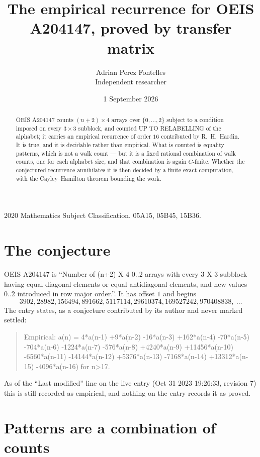 \documentclass[11pt,a4paper]{article}
\title{The empirical recurrence for OEIS A204147, proved by transfer matrix}
\author{Adrian Perez Fontelles\\ \small Independent researcher}
\date{1 September 2026}
\theoremstyle{plain}
\theoremstyle{definition}
\begin{document}
\maketitle

\begin{abstract}
OEIS A204147 counts $(n+2)\times4$ arrays over $\{0,\dots,2\}$ subject to a condition imposed on
every $3\times3$ subblock, and counted UP TO RELABELLING of the
alphabet; it carries an empirical recurrence of order $16$ contributed by
R.~H.~Hardin. It is true, and it is decidable rather than empirical. What is counted is
equality patterns, which is not a walk count --- but it is a fixed rational combination of
walk counts, one for each alphabet size, and that combination is again $C$-finite. Whether the
conjectured recurrence annihilates it is then decided by a finite exact computation, with the
Cayley--Hamilton theorem bounding the work.
\end{abstract}

\noindent\small 2020 Mathematics Subject Classification. 05A15, 05B45, 15B36.\normalsize

\section{The conjecture}

OEIS A204147 is ``Number of (n+2) X 4 0..2 arrays with every 3 X 3 subblock having equal diagonal elements or equal antidiagonal elements, and new values 0..2 introduced in row major order.''. It has offset $1$ and begins
\[
3902, 28982, 156494, 891662, 5117114, 29610374, 169527242, 970408838,\ \dots
\]
The entry states, as a conjecture contributed by its author and never marked settled:
\begin{quote}
Empirical: a(n) = 4*a(n-1) +9*a(n-2) -16*a(n-3) +162*a(n-4) -70*a(n-5) -704*a(n-6) -1224*a(n-7) -576*a(n-8) +4240*a(n-9) +11456*a(n-10) -6560*a(n-11) -14144*a(n-12) +5376*a(n-13) -7168*a(n-14) +13312*a(n-15) -4096*a(n-16) for n>17.
\end{quote}
As of the ``Last modified'' line on the live entry (Oct 31 2023 19:26:33, revision 7) this is still
recorded as empirical, and nothing on the entry records it as proved.

\section{Patterns are a combination of counts}
\end{document}
